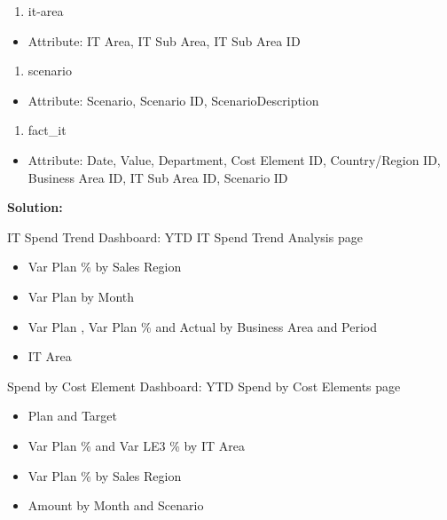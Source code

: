 \documentclass[]{book}
\providecommand{\tightlist}{%
  \setlength{\itemsep}{0pt}\setlength{\parskip}{0pt}}
\begin{document}
\begin{enumerate}
\def\labelenumi{\arabic{enumi}.}
\setcounter{enumi}{5}
\tightlist
\item
  it-area
\end{enumerate}

\begin{itemize}
\tightlist
\item
  Attribute: IT Area, IT Sub Area, IT Sub Area ID
\end{itemize}

\begin{enumerate}
\def\labelenumi{\arabic{enumi}.}
\setcounter{enumi}{6}
\tightlist
\item
  scenario
\end{enumerate}

\begin{itemize}
\tightlist
\item
  Attribute: Scenario, Scenario ID, ScenarioDescription
\end{itemize}

\begin{enumerate}
\def\labelenumi{\arabic{enumi}.}
\setcounter{enumi}{7}
\tightlist
\item
  fact\_it
\end{enumerate}

\begin{itemize}
\tightlist
\item
  Attribute: Date, Value, Department, Cost Element ID, Country/Region
  ID, Business Area ID, IT Sub Area ID, Scenario ID
\end{itemize}

\textbf{Solution:}

IT Spend Trend Dashboard: YTD IT Spend Trend Analysis page

\begin{itemize}
\tightlist
\item
  Var Plan \% by Sales Region
\item
  Var Plan by Month
\item
  Var Plan , Var Plan \% and Actual by Business Area and Period
\item
  IT Area
\end{itemize}

Spend by Cost Element Dashboard: YTD Spend by Cost Elements page

\begin{itemize}
\tightlist
\item
  Plan and Target
\item
  Var Plan \% and Var LE3 \% by IT Area
\item
  Var Plan \% by Sales Region
\item
  Amount by Month and Scenario
\end{itemize}
\end{document}
